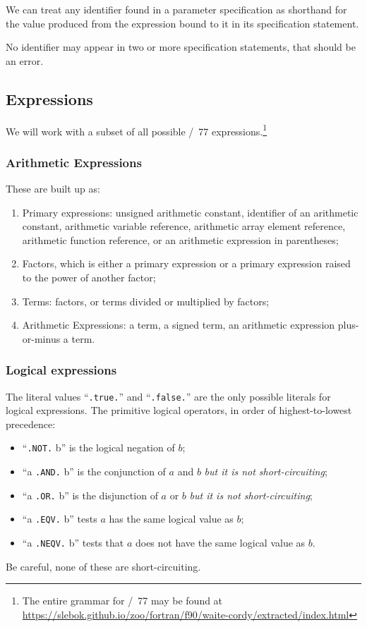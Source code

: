 \noindent We can treat any identifier found in a parameter specification as
shorthand for the value produced from the expression bound to it in its
specification statement.

No identifier may appear in two or more specification statements, that
should be an error.

\subsection{Expressions}
We will work with a subset of all possible \FORTRAN/~77
expressions.\footnote{The entire grammar for \FORTRAN/~77 may be found
at \url{https://slebok.github.io/zoo/fortran/f90/waite-cordy/extracted/index.html}}

\subsubsection{Arithmetic Expressions}
These are built up as:
\begin{enumerate}
\item Primary expressions: unsigned arithmetic constant, identifier of
  an arithmetic constant, arithmetic variable reference, arithmetic
  array element reference, arithmetic function reference, or an
  arithmetic expression in parentheses;
\item Factors, which is either a primary expression or a primary
  expression raised to the power of another factor;
\item Terms: factors, or terms divided or multiplied by factors; 
\item Arithmetic Expressions: a term, a signed term, an arithmetic
  expression plus-or-minus a term.
\end{enumerate}

\subsubsection{Logical expressions}
The literal values ``\texttt{.true.}'' and ``\texttt{.false.}'' are the
only possible literals for logical expressions. The primitive logical
operators, in order of highest-to-lowest precedence:
\begin{itemize}
\item ``\texttt{.NOT.} b'' is the logical negation of $b$;
\item ``a \texttt{.AND.} b'' is the conjunction of $a$ and $b$ \emph{but it is not short-circuiting};
\item ``a \texttt{.OR.} b'' is the disjunction of $a$ or $b$ \emph{but it is not short-circuiting};
\item ``a \texttt{.EQV.} b'' tests $a$ has the same logical value as $b$;
\item ``a \texttt{.NEQV.} b'' tests that $a$ does not have the same
  logical value as $b$.
\end{itemize}
Be careful, none of these are short-circuiting.

